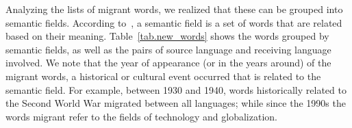 \documentclass[10pt,letterpaper]{article} %
\begin{document}
Analyzing the lists  of 
migrant words, we realized that
these can be grouped into semantic fields. According to~\cite{semantic_oxford},
a semantic field is a set of words that are related based on their meaning.
Table~\ref{tab.new_words} shows the words grouped by semantic fields, as well as
the pairs of source language and receiving language involved. We note that the
year of appearance (or in the years around) of the migrant words, a historical
or cultural event occurred that is related to the semantic field. For example,
between 1930 and 1940, words historically related to the Second World War
migrated between all languages; while since the 1990s the words migrant refer
to the fields of technology and globalization.  
\end{document}
